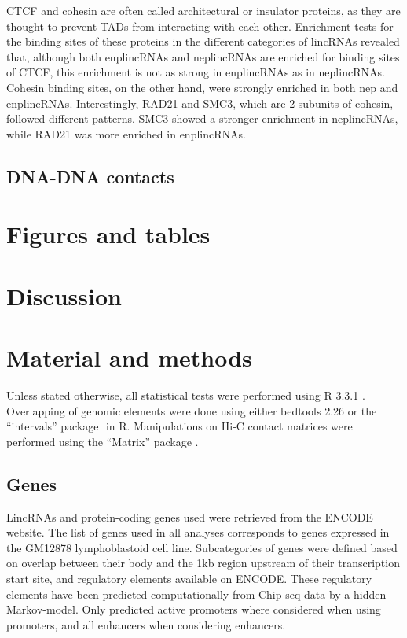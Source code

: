 \documentclass[10pt,a4paper]{report}
\begin{document}
CTCF and cohesin are often called architectural or insulator proteins, as they are thought to prevent TADs from interacting with each other. Enrichment tests for the binding sites of these proteins in the different categories of lincRNAs revealed that, although both enplincRNAs and neplincRNAs are enriched for binding sites of CTCF, this enrichment is not as strong in enplincRNAs as in neplincRNAs.
Cohesin binding sites, on the other hand, were strongly enriched in both nep and enplincRNAs. Interestingly, RAD21 and SMC3, which are 2 subunits of cohesin, followed different patterns. SMC3 showed a stronger enrichment in neplincRNAs, while RAD21 was more enriched in enplincRNAs.

\subsection*{DNA-DNA contacts}

\section*{Figures and tables}

\section*{Discussion}

\section*{Material and methods}

Unless stated otherwise, all statistical tests were performed using R 3.3.1 \cite{RCoreTeam2016}. Overlapping of genomic elements were done using either bedtools 2.26 \cite{Quinlan2010} ⁠or the “intervals” package \cite{Bourgon2015}⁠ in R. Manipulations on Hi-C contact matrices were performed using the “Matrix” package \cite{Bates2016}⁠.


\subsection*{Genes}

LincRNAs and protein-coding genes used were retrieved from the ENCODE website. The list of genes used in all analyses corresponds to genes expressed in the GM12878 lymphoblastoid cell line. Subcategories of genes were defined based on overlap between their body and the 1kb region upstream of their transcription start site, and regulatory elements available on ENCODE. These regulatory elements have been predicted computationally from Chip-seq data by a hidden Markov-model. Only predicted active promoters where considered when using promoters, and all enhancers when considering enhancers.
\end{document}
